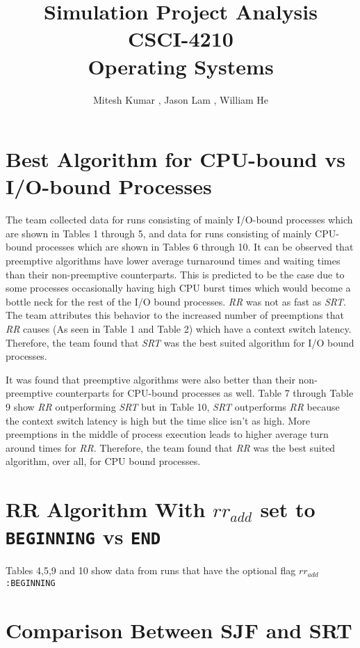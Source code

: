 \documentclass{article}
\title{\textbf{Simulation Project Analysis} \\ 
       \textbf{CSCI-4210} \\ 
       \textbf{Operating Systems}}
\author{Mitesh Kumar {\tt <kumarm4>}, Jason Lam {\tt <lamj7>}, William He {\tt <hew7>}}
\begin{document}
\maketitle

\section{Best Algorithm for CPU-bound vs I/O-bound Processes}
\begin{doublespace}
The team collected data for runs consisting of mainly I/O-bound processes which are shown in Tables 1 through 5, 
and data for runs consisting of mainly CPU-bound processes which are shown in Tables 6 through 10. It can be observed
that preemptive algorithms have lower average turnaround times and waiting times than their non-preemptive counterparts. 
This is predicted to be the case due to some processes occasionally having high CPU burst times which would become a 
bottle neck for the rest of the I/O bound processes. \textit{RR} was not as fast as \textit{SRT}. The team attributes this
behavior to the increased number of preemptions that \textit{RR} causes (As seen in Table 1 and Table 2) which have a context 
switch latency. Therefore, the team found that \textit{SRT} was the best suited algorithm for I/O bound processes.

It was found that preemptive algorithms were also better than their non-preemptive counterparts for CPU-bound processes as well.
Table 7 through Table 9 show \textit{RR} outperforming \textit{SRT} but in Table 10, \textit{SRT} outperforms \textit{RR} because
the context switch latency is high but the time slice isn't as high. More preemptions in the middle of process execution leads 
to higher average turn around times for \textit{RR}. Therefore, the team found that \textit{RR} was the best suited algorithm,
over all, for CPU bound processes.

\end{doublespace}

\section{RR Algorithm With {\tt $rr_{add}$} set to {\tt BEGINNING} vs {\tt END}}
\begin{doublespace}
Tables 4,5,9 and 10 show data from runs that have the optional flag {\tt $rr_{add}$:BEGINNING}

\end{doublespace}
\section{Comparison Between SJF and SRT}
\end{document}
